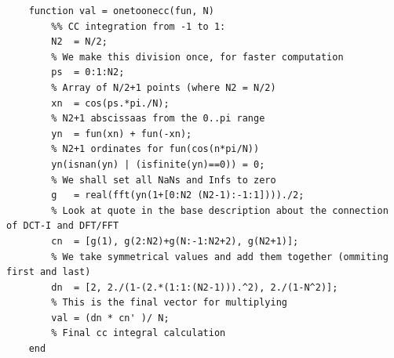 \documentclass[12pt,twoside,a4paper]{article}
\numberwithin{equation}{subsection}
\numberwithin{figure}{subsection}
\begin{document}
\begin{lstlisting}
	function val = onetoonecc(fun, N)
	    %% CC integration from -1 to 1:
	    N2  = N/2;                                           
	    % We make this division once, for faster computation
	    ps  = 0:1:N2;                                        
	    % Array of N/2+1 points (where N2 = N/2)
	    xn  = cos(ps.*pi./N);                                
	    % N2+1 abscissaas from the 0..pi range
	    yn  = fun(xn) + fun(-xn);                            
	    % N2+1 ordinates for fun(cos(n*pi/N))
	    yn(isnan(yn) | (isfinite(yn)==0)) = 0;               
	    % We shall set all NaNs and Infs to zero
	    g   = real(fft(yn(1+[0:N2 (N2-1):-1:1])))./2;        
	    % Look at quote in the base description about the connection of DCT-I and DFT/FFT
	    cn  = [g(1), g(2:N2)+g(N:-1:N2+2), g(N2+1)];         
	    % We take symmetrical values and add them together (ommiting first and last)
	    dn  = [2, 2./(1-(2.*(1:1:(N2-1))).^2), 2./(1-N^2)];  
	    % This is the final vector for multiplying
	    val = (dn * cn' )/ N;                                
	    % Final cc integral calculation
	end
\end{lstlisting}
\end{document}
